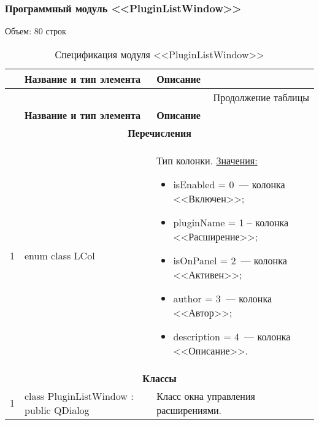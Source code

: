 \subsubsection*{Программный модуль <<PluginListWindow>>}
Объем: 80 строк

\small
\singlespacing
\begin{longtable}[h]{|p{}|p{}|p{}|}
  \caption{Спецификация модуля <<PluginListWindow>>}
	\\ \hline
	  \textbf{\No}                  &
	  \textbf{Название и тип элемента}  &
	  \textbf{Описание}
	\\ \hline
  \endfirsthead

  \multicolumn{3}{r}{Продолжение таблицы \thetable{}}
  \\ \hline
	  \textbf{\No}                  &
	  \textbf{Название и тип элемента}  &
	  \textbf{Описание}
	\\ \hline
  \endhead

  \multicolumn{3}{|c|}{\textbf{Перечисления}} \\
  \hline
  1 & enum class LCol &
    Тип колонки.\newline
    \uline{Значения:}
    \begin{itemize}[nolistsep,label=,leftmargin=0cm]
      \item isEnabled = 0~--- колонка <<Включен>>;
      \item pluginName = 1 -- колонка <<Расширение>>;
      \item isOnPanel = 2~--- колонка <<Активен>>;
      \item author = 3~--- колонка <<Автор>>;
      \item description = 4~--- колонка <<Описание>>.
    \end{itemize} \\ \hline

  \multicolumn{3}{|c|}{\textbf{Классы}} \\
  \hline
  1 & class PluginListWindow : public QDialog & Класс окна управления расширениями. \\ \hline
\end{longtable}
\normalsize
\onehalfspacing


